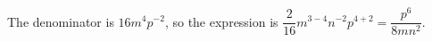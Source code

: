 The denominator is $16m^4p^{-2}$, so the expression is $\dfrac{2}{16}m^{3-4}n^{-2}p^{4+2}=\boxed{\dfrac{p^6}{8mn^2}}$.
